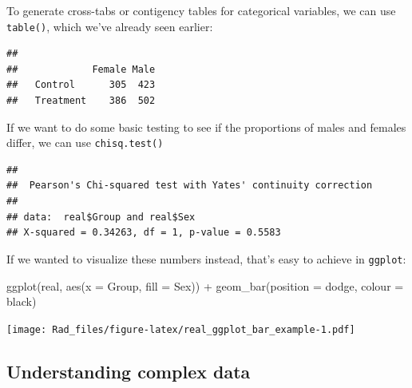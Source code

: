 \documentclass[
]{book}
\newenvironment{Shaded}{\begin{snugshade}}{\end{snugshade}}
\newcommand{\AttributeTok}[1]{\textcolor[rgb]{0.77,0.63,0.00}{#1}}
\newcommand{\FunctionTok}[1]{\textcolor[rgb]{0.00,0.00,0.00}{#1}}
\newcommand{\NormalTok}[1]{#1}
\newcommand{\SpecialCharTok}[1]{\textcolor[rgb]{0.00,0.00,0.00}{#1}}
\newcommand{\StringTok}[1]{\textcolor[rgb]{0.31,0.60,0.02}{#1}}
\begin{document}
To generate cross-tabs or contigency tables for categorical
variables, we can use \texttt{table()}, which we've already seen
earlier:

\begin{Shaded}
\end{Shaded}

\begin{verbatim}
##            
##             Female Male
##   Control      305  423
##   Treatment    386  502
\end{verbatim}

If we want to do some basic testing to see if the
proportions of males and females differ, we can use \texttt{chisq.test()}

\begin{Shaded}
\end{Shaded}

\begin{verbatim}
## 
##  Pearson's Chi-squared test with Yates' continuity correction
## 
## data:  real$Group and real$Sex
## X-squared = 0.34263, df = 1, p-value = 0.5583
\end{verbatim}

If we wanted to visualize these numbers instead,
that's easy to achieve in \texttt{ggplot}:

\begin{Shaded}
\begin{Highlighting}[]
\FunctionTok{ggplot}\NormalTok{(real, }\FunctionTok{aes}\NormalTok{(}\AttributeTok{x =}\NormalTok{ Group, }\AttributeTok{fill =}\NormalTok{ Sex)) }\SpecialCharTok{+}
    \FunctionTok{geom\_bar}\NormalTok{(}\AttributeTok{position =} \StringTok{\textquotesingle{}dodge\textquotesingle{}}\NormalTok{, }\AttributeTok{colour =} \StringTok{\textquotesingle{}black\textquotesingle{}}\NormalTok{)}
\end{Highlighting}
\end{Shaded}

\texttt{[image: Rad\_files/figure-latex/real\_ggplot\_bar\_example-1.pdf]}

\hypertarget{understanding-complex-data}{%
\subsection{Understanding complex data}\label{understanding-complex-data}}
\end{document}

